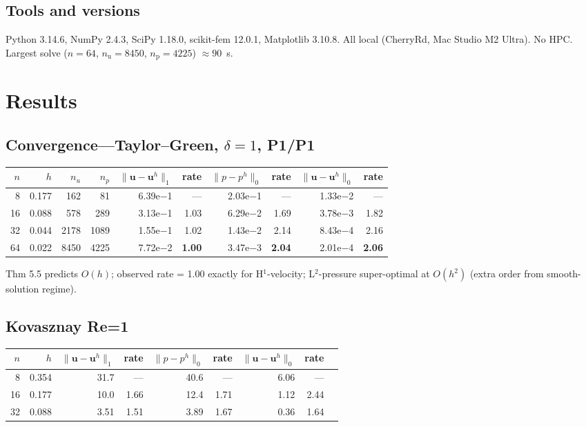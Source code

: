 \documentclass[11pt]{article}
\begin{document}
\subsection{Tools and versions}
Python 3.14.6, NumPy 2.4.3, SciPy 1.18.0, scikit-fem 12.0.1, Matplotlib 3.10.8. All local (CherryRd, Mac Studio M2 Ultra). No HPC. Largest solve ($n=64$, $n_\text{u}=8450$, $n_\text{p}=4225$) $\approx 90$~s.

\section{Results}

\subsection{Convergence---Taylor--Green, $\delta{=}1$, P1/P1}

\begin{table}[h]
\centering\small
\begin{tabular}{@{}rrrrrrrrrr@{}}
\toprule
$n$ & $h$ & $n_u$ & $n_p$ & $\|\mathbf{u}{-}\mathbf{u}^h\|_1$ & rate & $\|p{-}p^h\|_0$ & rate & $\|\mathbf{u}{-}\mathbf{u}^h\|_0$ & rate \\
\midrule
8  & 0.177 & 162  & 81   & 6.39e$-$1 & ---   & 2.03e$-$1 & ---   & 1.33e$-$2 & --- \\
16 & 0.088 & 578  & 289  & 3.13e$-$1 & 1.03  & 6.29e$-$2 & 1.69  & 3.78e$-$3 & 1.82 \\
32 & 0.044 & 2178 & 1089 & 1.55e$-$1 & 1.02  & 1.43e$-$2 & 2.14  & 8.43e$-$4 & 2.16 \\
64 & 0.022 & 8450 & 4225 & 7.72e$-$2 & \textbf{1.00} & 3.47e$-$3 & \textbf{2.04} & 2.01e$-$4 & \textbf{2.06} \\
\bottomrule
\end{tabular}
\end{table}

Thm 5.5 predicts $O(h)$; observed rate = 1.00 exactly for H$^1$-velocity; L$^2$-pressure super-optimal at $O(h^2)$ (extra order from smooth-solution regime).

\subsection{Kovasznay Re=1}

\begin{table}[h]
\centering\small
\begin{tabular}{@{}rrrrrrrrr@{}}
\toprule
$n$ & $h$ & $\|\mathbf{u}{-}\mathbf{u}^h\|_1$ & rate & $\|p{-}p^h\|_0$ & rate & $\|\mathbf{u}{-}\mathbf{u}^h\|_0$ & rate \\
\midrule
8  & 0.354 & 31.7 & --- & 40.6 & --- & 6.06 & --- \\
16 & 0.177 & 10.0 & 1.66 & 12.4 & 1.71 & 1.12 & 2.44 \\
32 & 0.088 & 3.51 & 1.51 & 3.89 & 1.67 & 0.36 & 1.64 \\
\bottomrule
\end{tabular}
\end{table}
\end{document}
